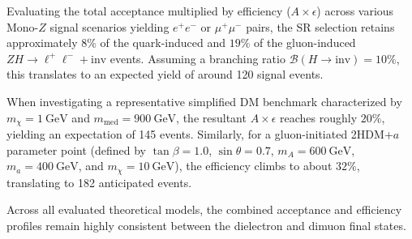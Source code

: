 Evaluating the total acceptance multiplied by efficiency ($A \times \epsilon$) across various Mono-$Z$ signal scenarios yielding $e^+e^-$ or $\mu^+\mu^-$ pairs, the SR selection retains approximately $8\%$ of the quark-induced and $19\%$ of the gluon-induced $ZH \to \ell^+\ell^- + \text{inv}$ events. Assuming a branching ratio $\mathcal{B}(H \to \text{inv}) = 10\%$, this translates to an expected yield of around 120 signal events.

When investigating a representative simplified DM benchmark characterized by $m_{\chi} = 1~\text{GeV}$ and $m_{\text{med}} = 900~\text{GeV}$, the resultant $A \times \epsilon$ reaches roughly $20\%$, yielding an expectation of 145 events. Similarly, for a gluon-initiated 2HDM+$a$ parameter point (defined by $\tan\beta = 1.0$, $\sin\theta = 0.7$, $m_A = 600~\text{GeV}$, $m_a = 400~\text{GeV}$, and $m_{\chi} = 10~\text{GeV}$), the efficiency climbs to about $32\%$, translating to 182 anticipated events. 

Across all evaluated theoretical models, the combined acceptance and efficiency profiles remain highly consistent between the dielectron and dimuon final states.

